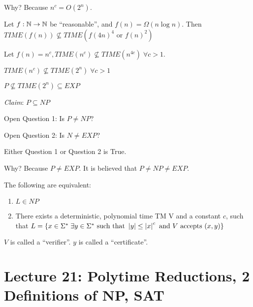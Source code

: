 Why? Because $n^c = O(2^n)$.

\begin{theorem}
    Let $f:\mathbb{N} \rightarrow \mathbb{N}$ be ``reasonable'', and $f(n) = \Omega(n \log{n})$. Then $TIME(f(n)) \not\subseteq TIME(f(4n)^4 \text{ or } f(n)^2)$
\end{theorem}

\begin{example}
    Let $f(n) = n^c, TIME(n^c) \not\subseteq TIME(n^{4c}) \; \forall c > 1$.
\end{example}

\begin{corollary}
    $TIME(n^c) \not\subseteq TIME(2^n) \;\forall c > 1$
\end{corollary}

\begin{corollary}
    $P \not\subseteq TIME(2^n) \subseteq EXP$
\end{corollary}

\emph{Claim}: $P \subseteq NP$

Open Question 1: Is $P \neq NP$?

Open Question 2: Is $N \neq EXP$?


\begin{theorem}
    Either Question 1 or Question 2 is True.
\end{theorem}

Why? Because $P \neq EXP$. It is believed that $P \neq NP \neq EXP$.

\begin{theorem}[Sipser 7.20]
    The following are equivalent:

    \begin{enumerate}
        \item $L \in NP$
        \item There exists a deterministic, polynomial time TM V and a constant $c$, such that $L = \left \{ x \in \Sigma^* \; \exists y \in \Sigma^* \text{ such that } \left | y \right | \leq \left | x \right |^c \text{ and } V \text{ accepts } (x, y) \right \}$
    \end{enumerate}
\end{theorem}

$V$ is called a ``verifier''. $y$ is called a ``certificate''.

\section*{Lecture 21: Polytime Reductions, 2 Definitions of NP, SAT}

